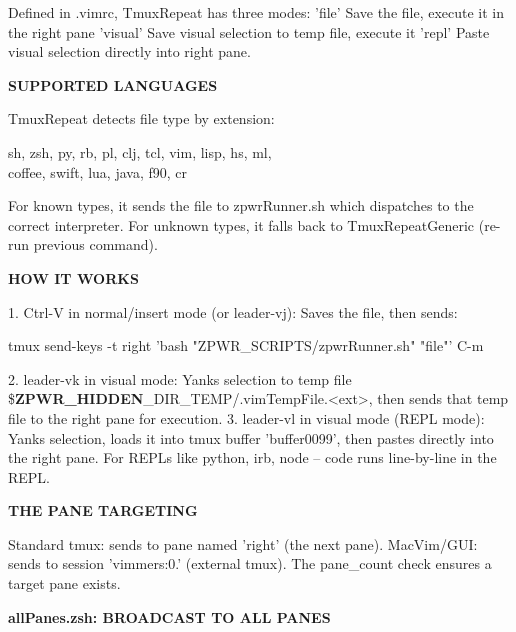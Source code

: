 \documentclass[11pt,a4paper,twoside]{book}
\begin{document}
Defined in .vimrc, TmuxRepeat has three modes: 'file'    Save the file, execute it in the right pane 'visual'  Save visual selection to temp file, execute it 'repl'    Paste visual selection directly into right pane.


\vspace{12pt}
{\bfseries\color{neonyellow} SUPPORTED LANGUAGES}\vspace{4pt}

TmuxRepeat detects file type by extension:

\begin{codebox}
\color{neongreen}sh, zsh, py, rb, pl, clj, tcl, vim, lisp, hs, ml,\\
\color{neongreen}coffee, swift, lua, java, f90, cr\\
\end{codebox}

For known types, it sends the file to zpwrRunner.sh which dispatches to the correct interpreter. For unknown types, it falls back to TmuxRepeatGeneric (re-run previous command).


\vspace{12pt}
{\bfseries\color{neonyellow} HOW IT WORKS}\vspace{4pt}

1. Ctrl-V in normal/insert mode (or leader-vj): Saves the file, then sends:

\begin{codebox}
\color{neongreen}tmux send-keys -t right 'bash "ZPWR\_SCRIPTS/zpwrRunner.sh" "file"' C-m\\
\end{codebox}

2. leader-vk in visual mode: Yanks selection to temp file \$\textbf{ZPWR\_HIDDEN}\_DIR\_TEMP/.vimTempFile.<ext>, then sends that temp file to the right pane for execution. 3. leader-vl in visual mode (REPL mode): Yanks selection, loads it into tmux buffer 'buffer0099', then pastes directly into the right pane. For REPLs like python, irb, node -- code runs line-by-line in the REPL.


\vspace{12pt}
{\bfseries\color{neonyellow} THE PANE TARGETING}\vspace{4pt}

Standard tmux: sends to pane named 'right' (the next pane). MacVim/GUI: sends to session 'vimmers:0.' (external tmux). The pane\_count check ensures a target pane exists.


\vspace{12pt}
{\bfseries\color{neonyellow} allPanes.zsh: BROADCAST TO ALL PANES}\vspace{4pt}
\end{document}
